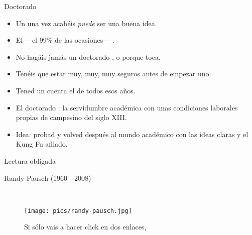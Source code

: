\documentclass[14pt]{beamer}
\newcommand{\WebLink}[2]{
  \href{#1}{\structure{\PointingHand~\color{sail-green}{#2}}}
}
\begin{document}
\begin{frame}{Doctorado}
  \begin{itemize}
    \item Un  una vez acabéis \emph{puede} ser una
      buena idea.
    \item El  —el 99\% de las ocasiones—
      .
    \item No hagáis jamás un doctorado , o
      porque toca.
    \item Tenéis que estar muy, muy, muy seguros antes de empezar uno.
    \item Tened un cuenta el  de todos
      esos años.
    \item El doctorado :
      la servidumbre académica con unas condiciones laborales propias
      de campesino del siglo XIII.
    \item Idea: probad  y volved
      después al mundo académico con las ideas claras y el Kung Fu
      afilado.
  \end{itemize}

  \begin{block}{\centering \small Lectura obligada}
    \centering \small
      \WebLink{http://matt.might.net/articles/phd-school-in-pictures/}
              {The illustrated guide to a Ph.D.}
  \end{block}

\end{frame}

\begin{frame}{Randy Pausch (1960---2008)}

  \begin{center}
    \WebLink{https://www.youtube.com/watch?v=ji5_MqicxSo}
            {The Last Lecture: Achieving Your Childhood Dreams}

            \CrossedBox \\
    \WebLink{https://www.youtube.com/watch?v=oTugjssqOT0}
            {Time Management}
  \end{center}

  \begin{figure}
    \centering
    \texttt{[image: pics/randy-pausch.jpg]}
    \caption*{\small Si sólo vais a hacer click en dos enlaces, }
  \end{figure}

\end{frame}
\end{document}
